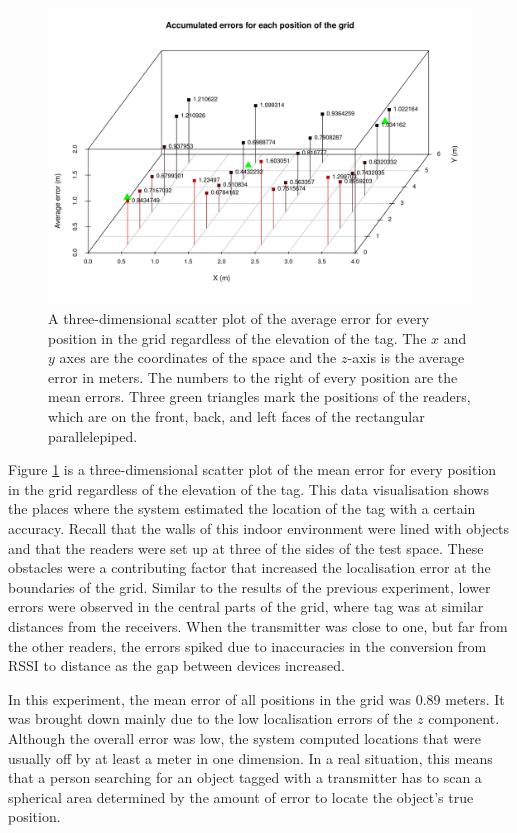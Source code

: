 \begin{figure}[H]
	\begin{center}
		\includegraphics[width=1\textwidth]{figures/tall2}
		\caption{A three-dimensional scatter plot of the average error for every position in the grid regardless of the elevation of the tag. The $x$ and $y$ axes are the coordinates of the space and the $z$-axis is the average error in meters. The numbers to the right of every position are the mean errors. Three green triangles mark the positions of the readers, which are on the front, back, and left faces of the rectangular parallelepiped.}
		\label{fig:errortall}
	\end{center}
\end{figure}

Figure \ref{fig:errortall} is a three-dimensional scatter plot of the mean error for every position in the grid regardless of the elevation of the tag. This data visualisation shows the places where the system estimated the location of the tag with a certain accuracy. Recall that the walls of this indoor environment were lined with objects and that the readers were set up at three of the sides of the test space. These obstacles were a contributing factor that increased the localisation error at the boundaries of the grid. Similar to the results of the previous experiment, lower errors were observed in the central parts of the grid, where tag was at similar distances from the receivers. When the transmitter was close to one, but far from the other readers, the errors spiked due to inaccuracies in the conversion from RSSI to distance as the gap between devices increased.

In this experiment, the mean error of all positions in the grid was 0.89 meters. It was brought down mainly due to the low localisation errors of the $z$ component. Although the overall error was low, the system computed locations that were usually off by at least a meter in one dimension. In a real situation, this means that a person searching for an object tagged with a transmitter has to scan a spherical area determined by the amount of error to locate the object's true position.

